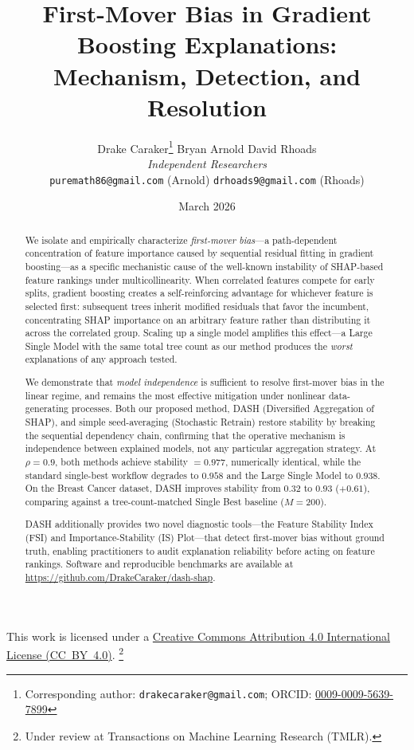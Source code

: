 \documentclass[11pt]{article}
\title{%
  \textbf{First-Mover Bias in Gradient Boosting Explanations:} \\[6pt]
  \large Mechanism, Detection, and Resolution
}
\author{
  Drake Caraker\thanks{Corresponding author: \texttt{drakecaraker@gmail.com}; ORCID: \href{https://orcid.org/0009-0009-5639-7899}{0009-0009-5639-7899}} \quad
  Bryan Arnold \quad
  David Rhoads \\[4pt]
  \textit{Independent Researchers} \\[2pt]
  \small\texttt{puremath86@gmail.com} (Arnold) \quad
  \small\texttt{drhoads9@gmail.com} (Rhoads)
}
\date{March 2026}
\newcommand{\dash}{\textsc{DASH}}
\newcommand{\rhovar}{\rho}
\begin{document}
\maketitle

\noindent\textsf{\small This work is licensed under a
\href{https://creativecommons.org/licenses/by/4.0/}{Creative Commons
Attribution 4.0 International License (CC~BY~4.0)}.}%
\footnote{Under review at Transactions on Machine Learning Research (TMLR).}
\vspace{4pt}

\begin{abstract}
We isolate and empirically characterize \emph{first-mover bias}---a
path-dependent concentration of feature importance caused by sequential
residual fitting in gradient boosting---as a specific mechanistic cause of the
well-known instability of SHAP-based feature rankings under
multicollinearity. When correlated features
compete for early splits, gradient boosting creates a self-reinforcing
advantage for whichever feature is selected first: subsequent trees inherit
modified residuals that favor the incumbent, concentrating SHAP importance on
an arbitrary feature rather than distributing it across the correlated group.
Scaling up a single model amplifies this effect---a Large Single Model with
the same total tree count as our method produces the \emph{worst} explanations
of any approach tested.

We demonstrate that \emph{model independence} is sufficient to resolve
first-mover bias in the linear regime, and remains the most effective
mitigation under nonlinear data-generating processes. Both our proposed
method, \dash{} (Diversified Aggregation of SHAP), and simple seed-averaging
(Stochastic Retrain) restore stability by breaking the sequential dependency
chain, confirming that the operative mechanism is independence between
explained models, not any particular aggregation strategy. At $\rhovar = 0.9$, both methods achieve stability
$= 0.977$, numerically identical, while the standard
single-best workflow degrades to $0.958$ and the Large Single Model to
$0.938$. On the Breast Cancer dataset, \dash{} improves stability from
$0.32$ to $0.93$ ($+0.61$), comparing against a tree-count-matched
Single Best baseline ($M{=}200$).

\dash{} additionally provides two novel diagnostic tools---the Feature
Stability Index (FSI) and Importance-Stability (IS) Plot---that detect
first-mover bias without ground truth, enabling practitioners to audit
explanation reliability before acting on feature rankings. Software and
reproducible benchmarks are available at
\url{https://github.com/DrakeCaraker/dash-shap}.
\end{abstract}
\end{document}

